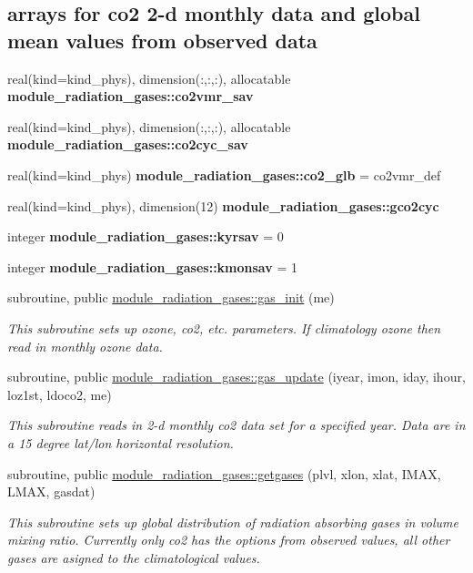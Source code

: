 \subsection*{arrays for co2 2-\/d monthly data and global mean values from observed data}
\begin{DoxyCompactItemize}
\item 
real(kind=kind\+\_\+phys), dimension(\+:,\+:,\+:), allocatable {\bfseries module\+\_\+radiation\+\_\+gases\+::co2vmr\+\_\+sav}
\item 
real(kind=kind\+\_\+phys), dimension(\+:,\+:,\+:), allocatable {\bfseries module\+\_\+radiation\+\_\+gases\+::co2cyc\+\_\+sav}
\item 
real(kind=kind\+\_\+phys) {\bfseries module\+\_\+radiation\+\_\+gases\+::co2\+\_\+glb} = co2vmr\+\_\+def
\item 
real(kind=kind\+\_\+phys), dimension(12) {\bfseries module\+\_\+radiation\+\_\+gases\+::gco2cyc}
\item 
integer {\bfseries module\+\_\+radiation\+\_\+gases\+::kyrsav} = 0
\item 
integer {\bfseries module\+\_\+radiation\+\_\+gases\+::kmonsav} = 1
\item 
subroutine, public \hyperlink{group__module__radiation__gases_gaeff1c60060c81d3f0693a542976ee3db}{module\+\_\+radiation\+\_\+gases\+::gas\+\_\+init} (me)
\begin{DoxyCompactList}\small\item\em This subroutine sets up ozone, co2, etc. parameters. If climatology ozone then read in monthly ozone data. \end{DoxyCompactList}\item 
subroutine, public \hyperlink{group__module__radiation__gases_gafce04ada352f998d640606528a8cd25c}{module\+\_\+radiation\+\_\+gases\+::gas\+\_\+update} (iyear, imon, iday, ihour, loz1st, ldoco2, me)
\begin{DoxyCompactList}\small\item\em This subroutine reads in 2-\/d monthly co2 data set for a specified year. Data are in a 15 degree lat/lon horizontal resolution. \end{DoxyCompactList}\item 
subroutine, public \hyperlink{group__module__radiation__gases_gacce60e9b372951eea9c6b3f28568e99c}{module\+\_\+radiation\+\_\+gases\+::getgases} (plvl, xlon, xlat, I\+M\+AX, L\+M\+AX, gasdat)
\begin{DoxyCompactList}\small\item\em This subroutine sets up global distribution of radiation absorbing gases in volume mixing ratio. Currently only co2 has the options from observed values, all other gases are asigned to the climatological values. \end{DoxyCompactList}\item 

\end{DoxyCompactItemize}

